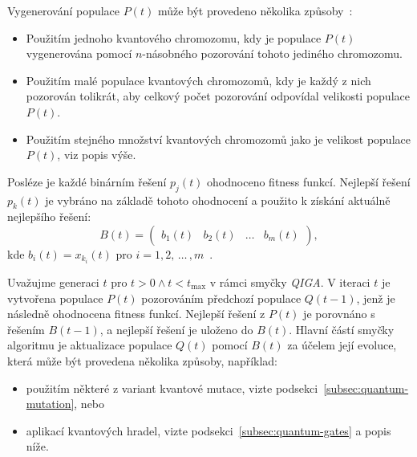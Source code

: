 Vygenerování populace $P(t)$ může být provedeno několika způsoby~\cite{NaturalComputing}:
\begin{itemize}
    \item Použitím jednoho kvantového chromozomu, kdy je populace $P(t)$ vygenerována pomocí $n$-násobného pozorování tohoto jediného chromozomu. 
    \item Použitím malé populace kvantových chromozomů, kdy je každý z nich pozorován tolikrát, aby celkový počet pozorování odpovídal velikosti populace $P(t)$.
    \item Použitím stejného množství kvantových chromozomů jako je velikost populace $P(t)$, viz popis výše.
\end{itemize}

Posléze je každé binárním řešení $p_j(t)$ ohodnoceno fitness funkcí. 
Nejlepší řešení $p_k(t)$ je vybráno na základě tohoto ohodnocení a použito k získání aktuálně nejlepšího řešení:
\begin{equation*}
    B(t) =
    \begin{pmatrix}
        b_1(t) & b_2(t) & \dots & b_m(t)
    \end{pmatrix},
\end{equation*}
kde $b_i(t) = x_{k_i}(t)$ pro $i = 1,2,\,\dots\,,m$~\cite{NaturalComputing,qiga}.

Uvažujme generaci $t$ pro $t>0 \wedge t<t_{\text{max}}$ v rámci smyčky \emph{QIGA}. 
V iteraci $t$ je vytvořena populace $P(t)$ pozorováním předchozí populace $Q(t-1)$, jenž je následně ohodnocena fitness funkcí. 
Nejlepší řešení z $P(t)$ je porovnáno s řešením $B(t-1)$, a nejlepší řešení je uloženo do $B(t)$. 
Hlavní částí smyčky algoritmu je aktualizace populace $Q(t)$ pomocí $B(t)$ za účelem její evoluce, která může být provedena několika způsoby, například:
\begin{itemize}
    \item použitím některé z variant kvantové mutace, vizte podsekci~\ref{subsec:quantum-mutation}, nebo
    \item aplikací kvantových hradel, vizte podsekci~\ref{subsec:quantum-gates} a popis níže.
\end{itemize}

